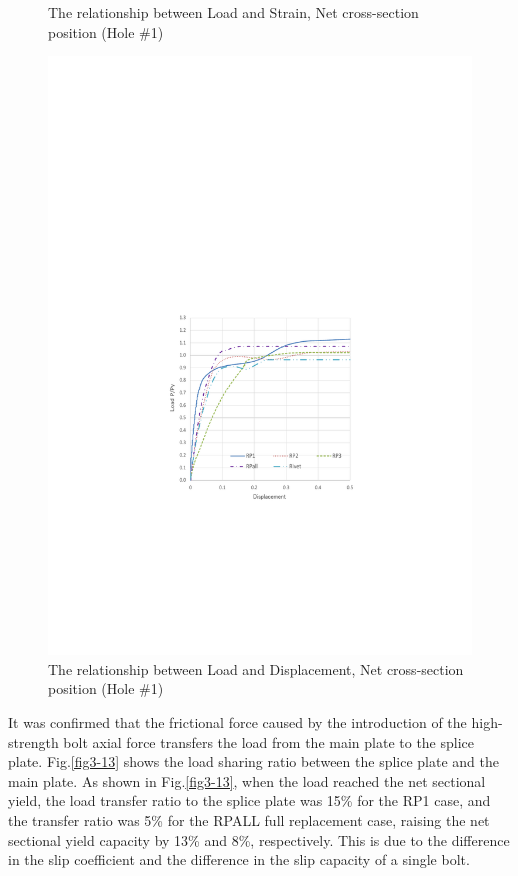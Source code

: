 \begin{figure}[htbp]
\begin{minipage}[t]{0.42\textwidth}
    \caption{The relationship between Load and Strain, Net cross-section position (Hole \#1)}
    \label{fig3-11}  
    \end{minipage}
    \begin{minipage}[t]{0.42\textwidth}
    \includegraphics[width=\linewidth]{imgs/ch3/fig3-12.pdf}
    \caption{The relationship between Load and Displacement, Net cross-section position (Hole \#1)}
    \label{fig3-12}  
    \end{minipage}
\end{figure}

It was confirmed that the frictional force caused by the introduction of the high-strength bolt axial force transfers the load from the main plate to the splice plate. Fig.\ref{fig3-13} shows the load sharing ratio between the splice plate and the main plate. As shown in Fig.\ref{fig3-13}, when the load reached the net sectional yield, the load transfer ratio to the splice plate was 15\% for the RP1 case, and the transfer ratio was 5\% for the RPALL full replacement case, raising the net sectional yield capacity by 13\% and 8\%, respectively. This is due to the difference in the slip coefficient and the difference in the slip capacity of a single bolt.

